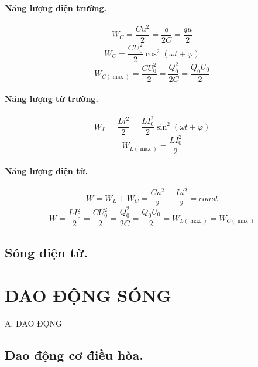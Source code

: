 \documentclass[12pt, a4paper]{report}
\begin{document}
\subsubsection{Năng lượng điện trường.}
\begin{equation}
    W_C = \frac{Cu^2}{2} = \frac{q}{2C} = \frac{qu}{2}
\end{equation}
\begin{equation}
    W_C = \frac{CU^2_0}{2}\cos^2 (\omega t + \varphi)
\end{equation}
\begin{equation}
    W_{C(\max)} = \frac{CU^2_0}{2} = \frac{Q_0^2}{2C} = \frac{Q_0 U_0}{2}
\end{equation}
\subsubsection{Năng lượng từ trường.}
\begin{equation}
    W_L = \frac{Li^2}{2}=\frac{LI_0^2}{2}\sin^2 (\omega t + \varphi)
\end{equation}
\begin{equation}
    W_{L(\max)} = \frac{LI_0^2}{2}
\end{equation}
\subsubsection{Năng lượng điện từ.}
\begin{equation}
    W = W_L + W_C = \frac{Cu^2}{2}+\frac{Li^2}{2} = const
\end{equation}
\begin{equation}
    W = \frac{LI_0^2}{2} = \frac{CU^2_0}{2} = \frac{Q_0^2}{2C} = \frac{Q_0U_0}{2} = W_{L(\max)} = W_{C(\max)}
\end{equation}
\section{Sóng điện từ.}
\newpage
\chapter{DAO ĐỘNG SÓNG}
\Large{A. DAO ĐỘNG}
\section{Dao động cơ điều hòa.}
\end{document}
